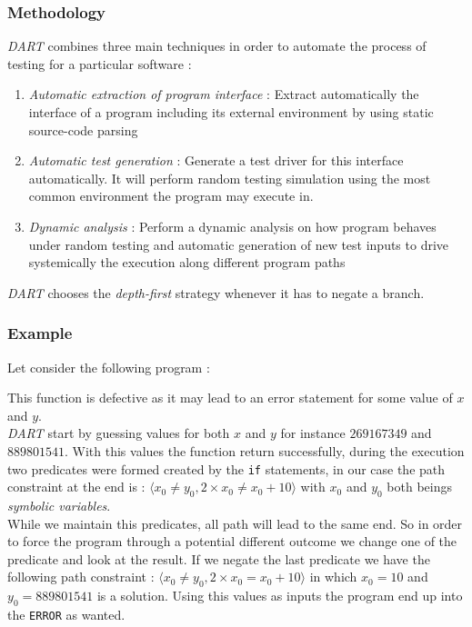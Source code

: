 \documentclass[11pt]{IEEEtran}
\begin{document}
    	\subsubsection{Methodology}
	    	\emph{DART} combines three main techniques \cite{godefroid2005dart} in order to automate the process of testing for a particular software :
	    	\begin{enumerate}
	    		\item \emph{Automatic extraction of program interface} : Extract automatically the interface of a program including its external environment by using static source-code parsing
	    		\item \emph{Automatic test generation} : Generate a test driver for this interface automatically. It will perform random testing simulation using the most common environment the program may execute in.
	    		\item \emph{Dynamic analysis} : Perform a dynamic analysis on how program behaves under random testing and automatic generation of new test inputs to drive systemically the execution along different program paths
	    	\end{enumerate}

			\emph{DART} chooses the \emph{depth-first} strategy whenever it has to negate a branch.

	    \subsubsection{Example}
		    Let consider the following program :

		    \begin{algorithm}


		    \end{algorithm}

	    	This function is defective as it may lead to an error statement for some value of $x$ and $y$.\\
	    	\emph{DART} start by guessing values for both $x$ and $y$ for instance $269167349$ and $889801541$. With this values the function return  successfully, during the execution two predicates were formed created by the \texttt{if} statements, in our case the path constraint at the end is : $\langle x_0 \neq y_0, 2 \times x_0 \neq x_0 + 10 \rangle$ with $x_0$ and $y_0$ both beings \emph{symbolic variables}.\\
	    	While we maintain this predicates, all path will lead to the same end. So in order to force  the program through a potential different outcome we change one of the predicate and look at the result. If we negate the last predicate we have the following path constraint : $\langle x_0 \neq y_0, 2 \times x_0 = x_0 + 10 \rangle$ in which $x_0=10$ and $y_0=889801541$ is a solution. Using this values as inputs the program end up into the \texttt{ERROR} as wanted.
\end{document}

